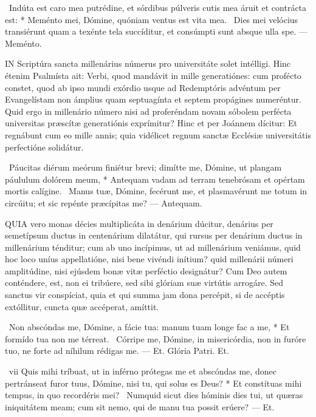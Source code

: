 \R\ Indúta est caro mea putrédine, et sórdibus púlveris cutis mea áruit et contrácta est: * Meménto mei, Dómine, quóniam ventus est vita mea. \V\ Dies mei velócius transiérunt quam a texénte tela succíditur, et consúmpti sunt absque ulla spe. — Meménto.


\lettrine[lines=2]{I}{N} Scriptúra sancta millenárius númerus pro universitáte solet intélligi. Hinc étenim Psalmísta ait: Verbi, quod mandávit in mille generatiónes: cum profécto constet, quod ab ipso mundi exórdio usque ad Redemptóris advéntum per Evangelístam non ámplius quam septuagínta et septem propágines numeréntur. Quid ergo in millenário número nisi ad proferéndam novam sóbolem perfécta universitas præscítæ generatiónis exprímitur? Hinc et per Joánnem dícitur: Et regnábunt cum eo mille annis; quia vidélicet regnum sanctæ Ecclésiæ universitátis perfectióne solidátur.

\R\ Páucitas diérum meórum finiétur brevi; dimítte me, Dómine, ut plangam páululum dolórem meum, * Antequam vadam ad terram tenebrósam et opértam mortis calígine. \V\ Manus tuæ, Dómine, fecérunt me, et plasmavérunt me totum in circúitu; et sic repénte præcípitas me? — Antequam.


\lettrine[lines=2]{Q}{UIA} vero monas décies multiplicáta in denárium dúcitur, denárius per semetípsum ductus in centenárium dilatátur, qui rursus per denárium ductus in millenárium ténditur; cum ab uno incípimus, ut ad millenárium veniámus, quid hoc loco uníus appellatióne, nisi bene vivéndi inítium? quid millenárii númeri amplitúdine, nisi ejúsdem bonæ vitæ perféctio designátur? Cum Deo autem conténdere, est, non ei tribúere, sed sibi glóriam suæ virtútis arrogáre. Sed sanctus vir conspíciat, quia et qui summa jam dona percépit, si de accéptis extóllitur, cuncta quæ accéperat, amíttit.

\R\ Non abscóndas me, Dómine, a fácie tua: manum tuam longe fac a me, * Et formído tua non me térreat. \V\ Córripe me, Dómine, in misericórdia, non in furóre tuo, ne forte ad níhilum rédigas me. — Et. Glória Patri. Et.

\R\ vii Quis mihi tríbuat, ut in inférno prótegas me et abscóndas me, donec pertránseat furor tuus, Dómine, nisi tu, qui solus es Deus? * Et constítuas mihi tempus, in quo recordéris mei? \V\ Numquid sicut dies hóminis dies tui, ut quæras iniquitátem meam; cum sit nemo, qui de manu tua possit erúere? — Et.

